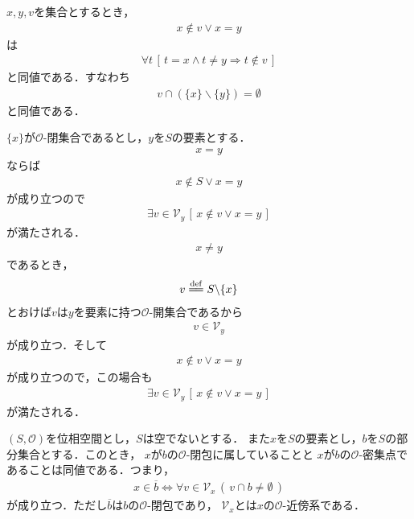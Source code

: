 	$x,y,v$を集合とするとき，
	\begin{align}
		x \notin v \vee x = y
	\end{align}
	は
	\begin{align}
		\forall t\, \left[\, t = x \wedge t \neq y \Longrightarrow t \notin v\, \right]
	\end{align}
	と同値である．すなわち
	\begin{align}
		v \cap (\{x\} \backslash \{y\}) = \emptyset
	\end{align}
	と同値である．
	
	\begin{sketch}
		$\{x\}$が$\mathscr{O}$-閉集合であるとし，$y$を$S$の要素とする．
		\begin{align}
			x = y
		\end{align}
		ならば
		\begin{align}
			x \notin S \vee x = y
		\end{align}
		が成り立つので
		\begin{align}
			\exists v \in \mathcal{V}_{y}\, \left[\, x \notin v \vee x = y\, \right]
		\end{align}
		が満たされる．
		\begin{align}
			x \neq y
		\end{align}
		であるとき，
		\begin{align}
			v \defeq S \backslash \{x\}
		\end{align}
		とおけば$v$は$y$を要素に持つ$\mathscr{O}$-開集合であるから
		\begin{align}
			v \in \mathcal{V}_{y}
		\end{align}
		が成り立つ．そして
		\begin{align}
			x \notin v \vee x = y
		\end{align}
		が成り立つので，この場合も
		\begin{align}
			\exists v \in \mathcal{V}_{y}\, \left[\, x \notin v \vee x = y\, \right]
		\end{align}
		が満たされる．
		\QED
	\end{sketch}
	
	\begin{screen}
		\begin{thm}[閉集合は密集点集合]
		\label{thm:belongs_to_closure_iff_clusters}
			$(S,\mathscr{O})$を位相空間とし，$S$は空でないとする．
			また$x$を$S$の要素とし，$b$を$S$の部分集合とする．このとき，
			$x$が$b$の$\mathscr{O}$-閉包に属していることと
			$x$が$b$の$\mathscr{O}$-密集点であることは同値である．つまり，
			\begin{align}
				x \in \overline{b} \Longleftrightarrow
				\forall v \in \mathcal{V}_{x}\, (\, v \cap b \neq \emptyset\, )
				\label{thm_belongs_to_closure_iff_clusters}
			\end{align}
			が成り立つ．ただし$\overline{b}$は$b$の$\mathscr{O}$-閉包であり，
			$\mathcal{V}_{x}$とは$x$の$\mathscr{O}$-近傍系である．
		\end{thm}
	\end{screen}
	
